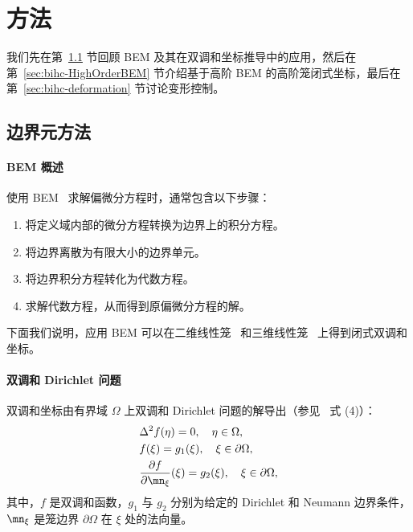 ﻿\section{方法}\label{sec:bihc-method}
我们先在第~\ref{sec:bihc-revisit} 节回顾 BEM 及其在双调和坐标推导中的应用，然后在第~\ref{sec:bihc-HighOrderBEM} 节介绍基于高阶 BEM 的高阶笼闭式坐标，最后在第~\ref{sec:bihc-deformation} 节讨论变形控制。

\subsection{边界元方法}\label{sec:bihc-revisit}
\paragraph{BEM 概述}
使用 BEM~\cite{Brebbia1978TheBE} 求解偏微分方程时，通常包含以下步骤：
\begin{enumerate}
    \item 将定义域内部的微分方程转换为边界上的积分方程。
    \item 将边界离散为有限大小的边界单元。
    \item 将边界积分方程转化为代数方程。
    \item 求解代数方程，从而得到原偏微分方程的解。
\end{enumerate}
下面我们说明，应用 BEM 可以在二维线性笼~\cite{Weber2012} 和三维线性笼~\cite{thiery2024biharmonic} 上得到闭式双调和坐标。

\paragraph{双调和 Dirichlet 问题}
双调和坐标由有界域 $\Omega$ 上双调和 Dirichlet 问题的解导出（参见~\cite{Weber2012} 式 (4)）：
\begin{equation}\label{equ:bihc-bihPDE}
\begin{aligned}
    &\Delta^2 f(\eta) = 0, \quad \eta \in \Omega, \\
    &f(\xi) = g_1(\xi), \quad \xi \in \partial \Omega, \\
    &\frac{\partial f}{\partial \mn_{\xi}}(\xi) = g_2(\xi), \quad \xi \in \partial \Omega,
\end{aligned}
\end{equation}
其中，$f$ 是双调和函数，\(g_1\) 与 \(g_2\) 分别为给定的 Dirichlet 和 Neumann 边界条件，\(\mn_{\xi}\) 是笼边界 \(\partial\Omega\) 在 \(\xi\) 处的法向量。

